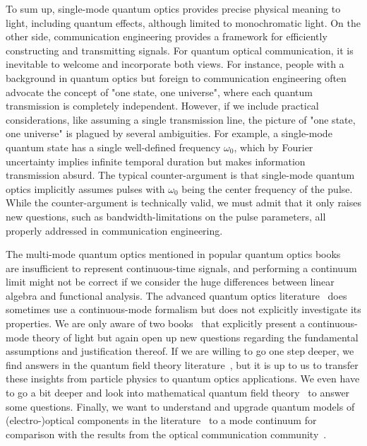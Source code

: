 To sum up, single-mode quantum optics provides precise physical meaning to light, including quantum effects, although limited to monochromatic light.
On the other side, communication engineering provides a framework for efficiently constructing and transmitting signals.
For quantum optical communication, it is inevitable to welcome and incorporate both views.
For instance, people with a background in quantum optics but foreign to communication engineering often advocate the concept of "one state, one universe", where each quantum transmission is completely independent.
However, if we include practical considerations, like assuming a single transmission line, the picture of "one state, one universe" is plagued by several ambiguities.
For example, a single-mode quantum state has a single well-defined frequency $\omega_0$, which by Fourier uncertainty implies infinite temporal duration but makes information transmission absurd.
The typical counter-argument is that single-mode quantum optics implicitly assumes pulses with $\omega_0$ being the center frequency of the pulse.
While the counter-argument is technically valid, we must admit that it only raises new questions, such as bandwidth-limitations on the pulse parameters, all properly addressed in communication engineering.

The multi-mode quantum optics mentioned in popular quantum optics books~\cite{Gerry2005,Fox2006} are insufficient to represent continuous-time signals, and performing a continuum limit might not be correct if we consider the huge differences between linear algebra and functional analysis.
The advanced quantum optics literature~\cite{Vogel2006,Mandel1995} does sometimes use a continuous-mode formalism but does not explicitly investigate its properties.
We are only aware of two books~\cite{Loudon2000,Barnett2002} that explicitly present a continuous-mode theory of light but again open up new questions regarding the fundamental assumptions and justification thereof.
If we are willing to go one step deeper, we find answers in the quantum field theory literature~\cite{Peskin1995,Srednicki2007,Greiner2013,Itzykson2012}, but it is up to us to transfer these insights from particle physics to quantum optics applications.
We even have to go a bit deeper and look into mathematical quantum field theory~\cite{Streater2016,Bogoliubov1982,Bogolubov1989} to answer some questions.
Finally, we want to understand and upgrade quantum models of (electro-)optical components in the literature~\cite{Vogel2006,Leonhardt2003,Haroche2006,Mandel1995} to a mode continuum for comparison with the results from the optical communication community~\cite{Shapiro2009,Kikuchi2016}.

